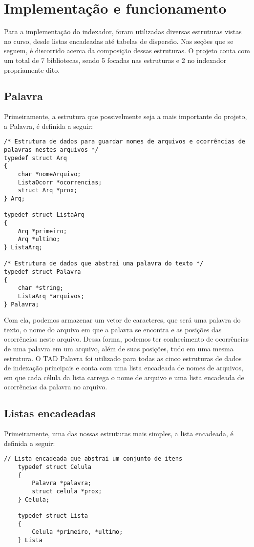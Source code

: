 \chapter{Implementação e funcionamento}\label{cap:implementacao-funcionamento}

Para a implementação do indexador, foram utilizadas diversas estruturas vistas no curso, desde listas encadeadas até tabelas de dispersão. Nas seções que se seguem, é discorrido acerca da composição dessas estruturas. O projeto conta com um total de 7 bibliotecas, sendo 5 focadas nas estruturas e 2 no indexador propriamente dito.

\section{Palavra}
Primeiramente, a estrutura que possivelmente seja a mais importante do projeto, a Palavra, é definida a seguir:
\begin{lstlisting}
/* Estrutura de dados para guardar nomes de arquivos e ocorrências de palavras nestes arquivos */
typedef struct Arq
{
    char *nomeArquivo;
    ListaOcorr *ocorrencias;
    struct Arq *prox;
} Arq;

typedef struct ListaArq
{
    Arq *primeiro;
    Arq *ultimo;
} ListaArq;

/* Estrutura de dados que abstrai uma palavra do texto */
typedef struct Palavra
{
    char *string;
    ListaArq *arquivos;
} Palavra;
\end{lstlisting}

Com ela, podemos armazenar um vetor de caracteres, que será uma palavra do texto, o nome do arquivo em que a palavra se encontra e as posições das ocorrências neste arquivo. Dessa forma, podemos ter conhecimento de ocorrências de uma palavra em um arquivo, além de suas posições, tudo em uma mesma estrutura. O TAD Palavra foi utilizado para todas as cinco estruturas de dados de indexação principais e conta com uma lista encadeada de nomes de arquivos, em que cada célula da lista carrega o nome de arquivo e uma lista encadeada de ocorrências da palavra no arquivo.

\section{Listas encadeadas}
Primeiramente, uma das nossas estruturas mais simples, a lista encadeada, é definida a seguir:
\begin{lstlisting}
// Lista encadeada que abstrai um conjunto de itens
    typedef struct Celula
    {
        Palavra *palavra;
        struct celula *prox;
    } Celula;
    
    typedef struct Lista
    {
        Celula *primeiro, *ultimo;
    } Lista
\end{lstlisting}

